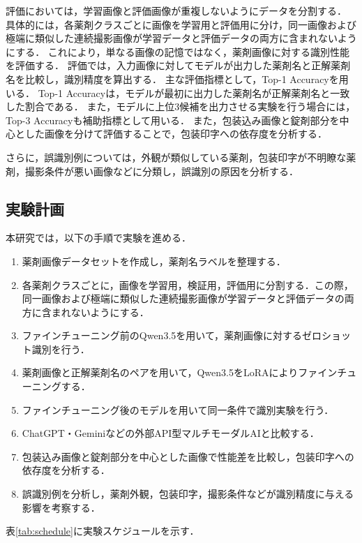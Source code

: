 \documentclass{jsarticle}
\begin{document}
評価においては，学習画像と評価画像が重複しないようにデータを分割する．
具体的には，各薬剤クラスごとに画像を学習用と評価用に分け，同一画像および極端に類似した連続撮影画像が学習データと評価データの両方に含まれないようにする．
これにより，単なる画像の記憶ではなく，薬剤画像に対する識別性能を評価する．
評価では，入力画像に対してモデルが出力した薬剤名と正解薬剤名を比較し，識別精度を算出する．
主な評価指標として，Top-1 Accuracyを用いる．
Top-1 Accuracyは，モデルが最初に出力した薬剤名が正解薬剤名と一致した割合である．
また，モデルに上位3候補を出力させる実験を行う場合には，Top-3 Accuracyも補助指標として用いる．
また，包装込み画像と錠剤部分を中心とした画像を分けて評価することで，包装印字への依存度を分析する．

さらに，誤識別例については，外観が類似している薬剤，包装印字が不明瞭な薬剤，撮影条件が悪い画像などに分類し，誤識別の原因を分析する．

\subsection{実験計画}

本研究では，以下の手順で実験を進める．

\begin{enumerate}
  \item 薬剤画像データセットを作成し，薬剤名ラベルを整理する．
  \item 各薬剤クラスごとに，画像を学習用，検証用，評価用に分割する．この際，同一画像および極端に類似した連続撮影画像が学習データと評価データの両方に含まれないようにする．
  \item ファインチューニング前のQwen3.5を用いて，薬剤画像に対するゼロショット識別を行う．
  \item 薬剤画像と正解薬剤名のペアを用いて，Qwen3.5をLoRAによりファインチューニングする．
  \item ファインチューニング後のモデルを用いて同一条件で識別実験を行う．
  \item ChatGPT・Geminiなどの外部API型マルチモーダルAIと比較する．
  \item 包装込み画像と錠剤部分を中心とした画像で性能差を比較し，包装印字への依存度を分析する．
  \item 誤識別例を分析し，薬剤外観，包装印字，撮影条件などが識別精度に与える影響を考察する．
\end{enumerate}

表\ref{tab:schedule}に実験スケジュールを示す．
\end{document}
